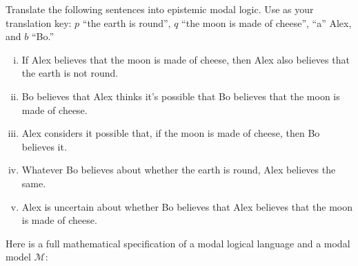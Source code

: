 \documentclass[nobib,nofonts]{tufte-handout}
\newcommand{\Model}{\ensuremath{\mathcal{M}}}
\begin{document}
\bigskip
\noindent \colorbox{mygray}{\centering
  \begin{minipage}{1.0\textwidth}

    \begin{exercise}
      Translate the following sentences into epistemic modal logic.
      Use as your translation key: $p$ ``the earth is round'', $q$ ``the moon is made of cheese'', ``a'' Alex, and $b$ ``Bo.''
      \begin{enumerate}[(i)]
        \item If Alex believes that the moon is made of cheese, then Alex also believes that the earth is not round.
        \item Bo believes that Alex thinks it's possible that Bo believes that the moon is made of cheese.
        \item Alex considers it possible that, if the moon is made of cheese, then Bo believes it.
        \item Whatever Bo believes about whether the earth is round, Alex believes the same.
        \item Alex is uncertain about whether Bo believes that Alex believes that the moon is made of cheese.
      \end{enumerate}
    \end{exercise}

    \begin{exercise}
      Here is a full mathematical specification of a modal logical language and a modal model $\Model$:


\end{exercise}
\end{minipage}}
\end{document}

